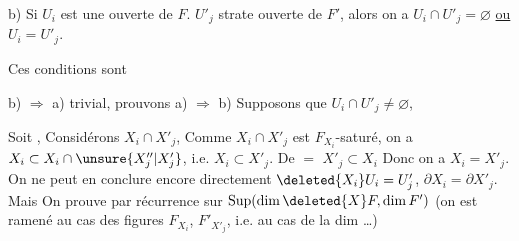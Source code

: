 



b) Si $U_i$ est une  ouverte de $F$. $U'_j$ strate ouverte de $F'$, alors on a $U_i\cap U'_j=\varnothing$ \uline{ou} $U_i=U'_j$.

Ces conditions sont 



b) $\Rightarrow$ a) trivial, prouvons a) $\Rightarrow$ b)  Supposons que $U_i\cap U'_j\ne\varnothing$,  


 Soit  , Considérons $X_i\cap X'_j$,  Comme $X_i\cap X'_j$ est  $F_{X_i}$-saturé,    on a $X_i\subset X_i\cap\unsure{X''_j|X'_j}$,
 i.e. $X_i\subset X'_j$. De $=$ $X'_j\subset X_i$ Donc on a $X_i=X'_j$. On ne peut en conclure encore directement $\deleted{X_i}U_i=U'_j$,   $\partial X_i=\partial X'_j$. Mais
On  prouve  par récurrence sur  $\operatorname{Sup}(\dim\deleted{X}F,\dim F')$ (on est ramené au cas des figures $F_{X_i}$, $F'_{X'_j}$, i.e. au cas de la dim \ldots)
